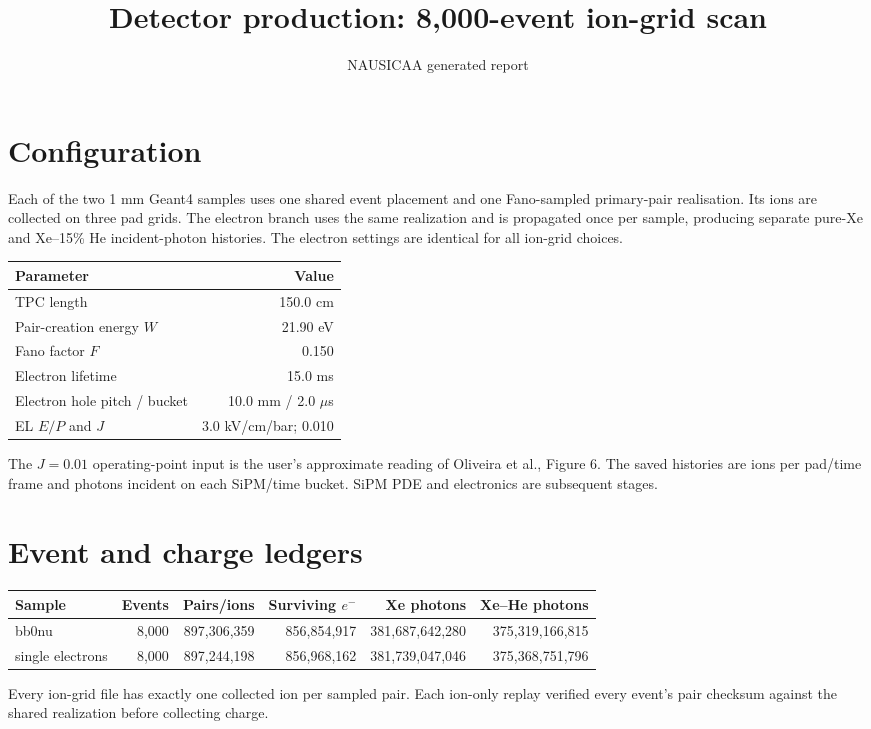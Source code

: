 \documentclass[11pt]{article}
\begin{document}
\title{Detector production: 8,000-event ion-grid scan}
\author{NAUSICAA generated report}
\date{}\maketitle
\section*{Configuration}
Each of the two 1 mm Geant4 samples uses one shared event placement and one Fano-sampled primary-pair realisation. Its ions are collected on three pad grids. The electron branch uses the same realization and is propagated once per sample, producing separate pure-Xe and Xe--15\% He incident-photon histories. The electron settings are identical for all ion-grid choices.
\begin{center}\begin{tabular}{lr}\toprule Parameter & Value\\\midrule
TPC length & 150.0 cm\\
Pair-creation energy $W$ & 21.90 eV\\
Fano factor $F$ & 0.150\\
Electron lifetime & 15.0 ms\\
Electron hole pitch / bucket & 10.0 mm / 2.0 $\mu$s\\
EL $E/P$ and $J$ & 3.0 kV/cm/bar; 0.010\\
\bottomrule\end{tabular}\end{center}
The $J=0.01$ operating-point input is the user's approximate reading of Oliveira et al., Figure 6. The saved histories are ions per pad/time frame and photons incident on each SiPM/time bucket. SiPM PDE and electronics are subsequent stages.
\section*{Event and charge ledgers}
\begin{center}\small\begin{tabular}{lrrrrr}\toprule
Sample & Events & Pairs/ions & Surviving $e^-$ & Xe photons & Xe--He photons\\\midrule
bb0nu & 8,000 & 897,306,359 & 856,854,917 & 381,687,642,280 & 375,319,166,815\\
single electrons & 8,000 & 897,244,198 & 856,968,162 & 381,739,047,046 & 375,368,751,796\\
\bottomrule\end{tabular}\end{center}
Every ion-grid file has exactly one collected ion per sampled pair. Each ion-only replay verified every event's pair checksum against the shared realization before collecting charge.
\end{document}
